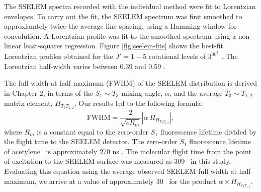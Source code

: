 \documentclass[12pt]{mitthesis}
\begin{document}
The SSELEM spectra recorded with the individual method were fit to
Lorentzian envelopes.  To carry out the fit, the SEELEM spectrum was
first smoothed to approxiamtely twice the average line spacing, using
a Hamming window for convolution.  A Lorentzian profile was fit to the
smoothed spectrum using a non-linear least-squares regression.  Figure
\ref{fig:seelem-fits} shows the best-fit Lorentzian profiles obtained
for the $J'=1-5$ rotational levels of $3^36^1$ .  The Lorentzian
half-width varies between 0.39 and 0.59 \rcm.

The full width at half maximum (FWHM) of the SEELEM distribution is
derived in Chapter 2, in terms of the $S_1 \sim T_3$ mixing angle,
$\alpha$, and the average $T_3 \sim T_{1,2}$ matrix element,
$H_{T_3T_{1,2}}$.  Our results led to the following formula:
\begin{equation}
  \text{FWHM} = 
    \frac{2}{\sqrt{e R_m}} 
    \left \lvert 
      \alpha \: H_{H_{T_3T_{1,2}}}
    \right \rvert, 
\end{equation}
where $R_m$ is a constant equal to the zero-order $S_1$ fluorescence
lifetime divided by the flight time to the SEELEM detector.  The
zero-order $S_1$ fluorescence lifetime of acetylene \astate\ is
approximately 270 ns \cite{ochi91}.  The molecular flight time from
the point of excitation to the SEELEM surface was measured as 309
\microsec\ in this study.  Evaluating this equation using the average
observed SEELEM full width at half maximum, we arrive at a value of
approximately 30 \rcm\ for the product $\alpha \times
H_{H_{T_3T_{1,2}}}$.

\end{document}
